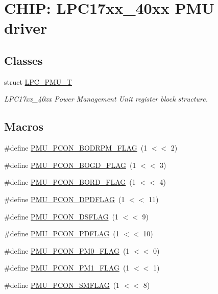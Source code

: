 \hypertarget{group__PMU__17XX__40XX}{}\section{C\+H\+IP\+: L\+P\+C17xx\+\_\+40xx P\+MU driver}
\label{group__PMU__17XX__40XX}
\subsection*{Classes}
\begin{DoxyCompactItemize}
\item 
struct \hyperlink{structLPC__PMU__T}{L\+P\+C\+\_\+\+P\+M\+U\+\_\+T}
\begin{DoxyCompactList}\small\item\em L\+P\+C17xx\+\_\+40xx Power Management Unit register block structure. \end{DoxyCompactList}\end{DoxyCompactItemize}
\subsection*{Macros}
\begin{DoxyCompactItemize}
\item 
\#define \hyperlink{group__PMU__17XX__40XX_gaf798eacf7261001d57b70bf4c3b9b863}{P\+M\+U\+\_\+\+P\+C\+O\+N\+\_\+\+B\+O\+D\+R\+P\+M\+\_\+\+F\+L\+AG}~(1 $<$$<$ 2)
\item 
\#define \hyperlink{group__PMU__17XX__40XX_ga542e24814279146e498ede308451d699}{P\+M\+U\+\_\+\+P\+C\+O\+N\+\_\+\+B\+O\+G\+D\+\_\+\+F\+L\+AG}~(1 $<$$<$ 3)
\item 
\#define \hyperlink{group__PMU__17XX__40XX_gad8a99ac828a3f50ca487efb9bab7cba1}{P\+M\+U\+\_\+\+P\+C\+O\+N\+\_\+\+B\+O\+R\+D\+\_\+\+F\+L\+AG}~(1 $<$$<$ 4)
\item 
\#define \hyperlink{group__PMU__17XX__40XX_ga81cd6baf090cf4649f51538b59e2e4af}{P\+M\+U\+\_\+\+P\+C\+O\+N\+\_\+\+D\+P\+D\+F\+L\+AG}~(1 $<$$<$ 11)
\item 
\#define \hyperlink{group__PMU__17XX__40XX_ga35db160b23010e0f598641f1f40ebd15}{P\+M\+U\+\_\+\+P\+C\+O\+N\+\_\+\+D\+S\+F\+L\+AG}~(1 $<$$<$ 9)
\item 
\#define \hyperlink{group__PMU__17XX__40XX_gabad3cddc54f9c1cdd8128ec65fc50691}{P\+M\+U\+\_\+\+P\+C\+O\+N\+\_\+\+P\+D\+F\+L\+AG}~(1 $<$$<$ 10)
\item 
\#define \hyperlink{group__PMU__17XX__40XX_ga68db97d4dfb92acf82b041ddbbfa692d}{P\+M\+U\+\_\+\+P\+C\+O\+N\+\_\+\+P\+M0\+\_\+\+F\+L\+AG}~(1 $<$$<$ 0)
\item 
\#define \hyperlink{group__PMU__17XX__40XX_gadd225d4b566562b24c0ccc3d8efa7372}{P\+M\+U\+\_\+\+P\+C\+O\+N\+\_\+\+P\+M1\+\_\+\+F\+L\+AG}~(1 $<$$<$ 1)
\item 
\#define \hyperlink{group__PMU__17XX__40XX_gabcad2ba661df07512a8facf72ad718a3}{P\+M\+U\+\_\+\+P\+C\+O\+N\+\_\+\+S\+M\+F\+L\+AG}~(1 $<$$<$ 8)
\end{DoxyCompactItemize}
